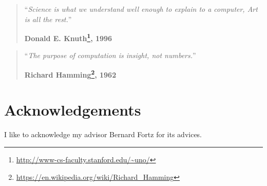 \documentclass[12pt,a4paper,oneside]{book}
\numberwithin{equation}{chapter}
\begin{document}
\newenvironment{vcenterpage}
{\newpage\thispagestyle{empty}
\vspace*{\fill}}
{\vspace*{\fill}\par\pagebreak}
\pagebreak

\thispagestyle{empty}
\vspace*{5cm}

\begin{quotation}
\noindent ``\emph{Science is what we understand well enough to explain to a computer, Art is all the rest.}''
\begin{flushright}\textbf{Donald E. Knuth\footnote{\url{http://www-cs-faculty.stanford.edu/~uno/}}, 1996}\end{flushright}
\end{quotation}

\medskip

\begin{quotation}
\noindent ``\emph{The purpose of computation is insight, not numbers.}''
\begin{flushright}\textbf{Richard Hamming\footnote{\url{https://en.wikipedia.org/wiki/Richard_Hamming}}, 1962}\end{flushright}
\end{quotation}

%

\setcounter{page}{0}

\tableofcontents
\listoffigures
\glsaddall
\printglossaries


\mainmatter


%


\chapter*{Acknowledgements}
\thispagestyle{empty}

I like to acknowledge my advisor Bernard Fortz for its advices.
\end{document}
